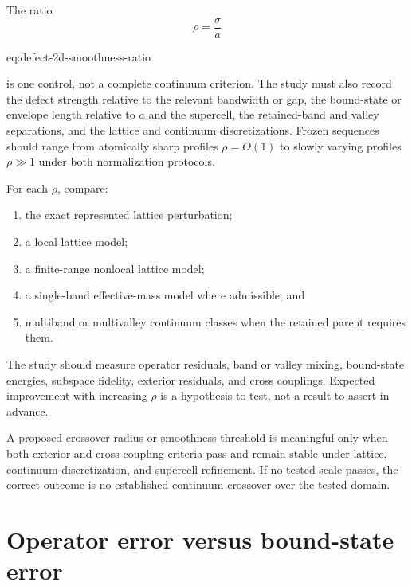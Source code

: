 The ratio
\begin{equation}
    \rho=\frac{\sigma}{a}
    \label{eq:defect-2d-smoothness-ratio}
\end{equation}
\begin{equationterms}{eq:defect-2d-smoothness-ratio}
\end{equationterms}
is one control, not a complete continuum criterion. The study must also record
the defect strength relative to the relevant bandwidth or gap, the bound-state
or envelope length relative to $a$ and the supercell, the retained-band and
valley separations, and the lattice and continuum discretizations. Frozen
sequences should range from atomically sharp profiles $\rho=O(1)$ to slowly
varying profiles $\rho\gg1$ under both normalization protocols.

For each $\rho$, compare:
\begin{enumerate}
    \item the exact represented lattice perturbation;
    \item a local lattice model;
    \item a finite-range nonlocal lattice model;
    \item a single-band effective-mass model where admissible; and
    \item multiband or multivalley continuum classes when the retained parent
          requires them.
\end{enumerate}
The study should measure operator residuals, band or valley mixing, bound-state
energies, subspace fidelity, exterior residuals, and cross couplings. Expected
improvement with increasing $\rho$ is a hypothesis to test, not a result to
assert in advance.

A proposed crossover radius or smoothness threshold is meaningful only when
both exterior and cross-coupling criteria pass and remain stable under lattice,
continuum-discretization, and supercell refinement. If no tested scale passes,
the correct outcome is no established continuum crossover over the tested
domain.

\section{Operator error versus bound-state error}

